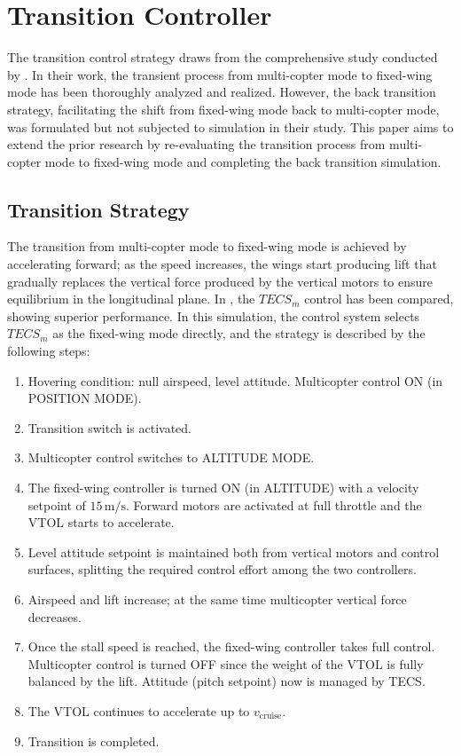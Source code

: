 \section{Transition Controller}
\label{section:Transition Strategy}

The transition control strategy draws from the comprehensive study conducted by \cite{battaini2022}. In their work, the transient process from multi-copter mode to fixed-wing mode has been thoroughly analyzed and realized. However, the back transition strategy, facilitating the shift from fixed-wing mode back to multi-copter mode, was formulated but not subjected to simulation in their study. This paper aims to extend the prior research by re-evaluating the transition process from multi-copter mode to fixed-wing mode and completing the back transition simulation.

\subsection{Transition Strategy}

The transition from multi-copter mode to fixed-wing mode is achieved by accelerating forward; as the speed increases, the wings start producing lift that gradually replaces the vertical force produced by the vertical motors to ensure equilibrium in the longitudinal plane. In  \cite{battaini2022}, the $TECS_m$ control has been compared, showing superior performance. In this simulation, the control system selects $TECS_m$ as the fixed-wing mode directly, and the strategy is described by the following steps:

\begin{enumerate}
    \item Hovering condition: null airspeed, level attitude. Multicopter control ON (in POSITION MODE).
    \item Transition switch is activated.
    \item Multicopter control switches to ALTITUDE MODE.
    \item The fixed-wing controller is turned ON (in ALTITUDE) with a velocity setpoint of $15 \, \text{m/s}$. Forward motors are activated at full throttle and the VTOL starts to accelerate.
    \item Level attitude setpoint is maintained both from vertical motors and control surfaces, splitting the required control effort among the two controllers.
    \item Airspeed and lift increase; at the same time multicopter vertical force decreases.
    \item Once the stall speed is reached, the fixed-wing controller takes full control. Multicopter control is turned OFF since the weight of the VTOL is fully balanced by the lift. Attitude (pitch setpoint) now is managed by TECS.
    \item The VTOL continues to accelerate up to $v_{\text{cruise}}$.
    \item Transition is completed.
\end{enumerate}

